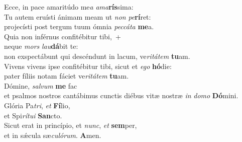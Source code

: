 \oddverse Ecce, in pace amaritúdo me\textit{a} \textit{a}\textit{ma}\textbf{rís}sima:\\
\evenverse Tu autem eruísti ánimam meam ut \textit{non} \textit{pe}\textbf{rí}ret:~\*\\
\evenverse projecísti post tergum tuum ómnia \textit{pec}\textit{cá}\textit{ta} \textbf{me}a.\\
\oddverse Quia non inférnus confitébitur tibi,~+\\
\oddverse  neque \textit{mors} \textit{lau}\textbf{dá}bit te:~\*\\
\oddverse non exspectábunt qui descéndunt in lacum, ve\textit{ri}\textit{tá}\textit{tem} \textbf{tu}am.\\
\evenverse Vivens vivens ipse confitébitur tibi, sicut et \textit{e}\textit{go} \textbf{hó}die:~\*\\
\evenverse pater fíliis notam fáciet ve\textit{ri}\textit{tá}\textit{tem} \textbf{tu}am.\\
\oddverse Dómine, \textit{sal}\textit{vum} \textbf{me} fac~\*\\
\oddverse et psalmos nostros cantábimus cunctis diébus vitæ nostræ \textit{in} \textit{do}\textit{mo} \textbf{Dó}mini.\\
\evenverse Glória Pa\textit{tri}, \textit{et} \textbf{Fí}lio,~\*\\
\evenverse et Spi\textit{rí}\textit{tu}\textit{i} \textbf{San}cto.\\
\oddverse Sicut erat in princípio, et \textit{nunc}, \textit{et} \textbf{sem}per,~\*\\
\oddverse et in sǽcula sæ\textit{cu}\textit{ló}\textit{rum}. \textbf{A}men.\\
